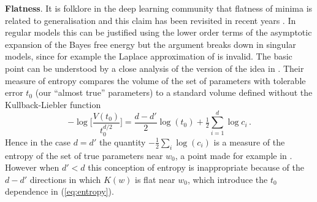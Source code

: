 \documentclass{article} %
\begin{document}
\textbf{Flatness}. It is folklore in the deep learning community that flatness of minima is related to generalisation \citep{hinton_keeping_1993, hochreiter1997flat} and this claim has been revisited in recent years \citep{chaudhari2019entropy, smith2017bayesian, jastrzkebski2017three, Zhang:2018MolPh.116.3214Z}. In regular models this can be justified using the lower order terms of the asymptotic expansion of the Bayes free energy \citep[\S 3.1]{Balasubramanian:1996cond.mat..1030B} but the argument breaks down in singular models, since for example the Laplace approximation of \cite{Zhang:2018MolPh.116.3214Z} is invalid. The basic point can be understood by a close analysis of the version of the idea in \citep{hochreiter1997flat}. Their measure of entropy compares the volume of the set of parameters with tolerable error $t_0$ (our ``almost true'' parameters) to a standard volume defined without the Kullback-Liebler function
\begin{equation}\label{eq:entropy}
- \log\Big[\frac{V(t_0)}{t_0^{d/2}}\Big] = \frac{d-d'}{2} \log(t_0) + \tfrac{1}{2} \sum_{i=1}^{d} \log c_i\,.
\end{equation}
Hence in the case $d = d'$ the quantity $-\tfrac{1}{2} \sum_i \log(c_i)$ is a measure of the entropy of the set of true parameters near $w_0$, a point made for example in \cite{Zhang:2018MolPh.116.3214Z}. However when $d' < d$ this conception of entropy is inappropriate because of the $d - d'$ directions in which $K(w)$ is flat near $w_0$, which introduce the $t_0$ dependence in (\ref{eq:entropy}).

\end{document}
